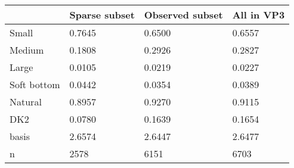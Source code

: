 \begin{tabular}{llll}
\toprule
 & Sparse subset & Observed subset & All in VP3 \\
\midrule
Small & 0.7645 & 0.6500 & 0.6557 \\
Medium & 0.1808 & 0.2926 & 0.2827 \\
Large & 0.0105 & 0.0219 & 0.0227 \\
Soft bottom & 0.0442 & 0.0354 & 0.0389 \\
Natural & 0.8957 & 0.9270 & 0.9115 \\
DK2 & 0.0780 & 0.1639 & 0.1654 \\
basis & 2.6574 & 2.6447 & 2.6477 \\
n & 2578 & 6151 & 6703 \\
\bottomrule
\end{tabular}
